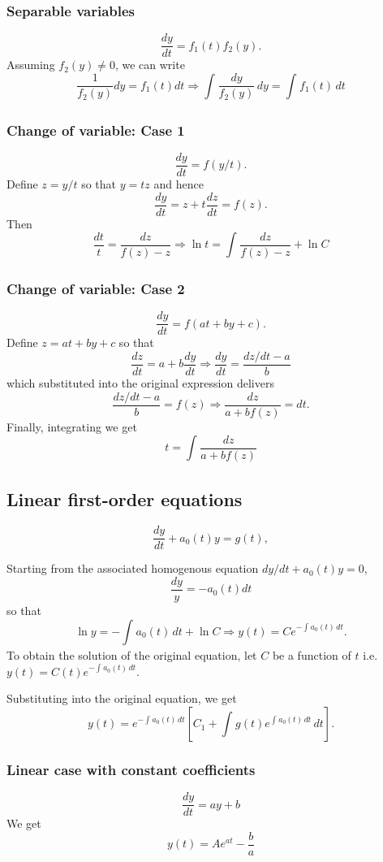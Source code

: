\subsubsection{Separable variables}
\[
    \frac{dy}{dt} = f_1(t)f_2(y).
\]
Assuming $f_2(y) \neq 0$, we can write \[
    \frac{1}{f_2(y)}dy = f_1(t)dt \Longrightarrow \int_{}^{} \frac{dy}{f_2(y)} \, dy = \int_{}^{} f_1(t) \, dt
\]

\subsubsection{Change of variable: Case 1}
\[
    \frac{dy}{dt} = f(y/t).
\]
Define $z = y/t$ so that $y=tz$ and hence \[
    \frac{dy}{dt} = z + t \frac{dz}{dt} = f(z).
\]
Then \[
    \frac{dt}{t} = \frac{dz}{f(z) - z} \Longrightarrow \ln t = \int_{}^{} \frac{dz}{f(z) - z} + \ln C
\]

\subsubsection{Change of variable: Case 2}
\[
    \frac{dy}{dt} = f(at+by+c).
\]
Define $z=at+by+c$ so that \[
    \frac{dz}{dt} = a+b \frac{dy}{dt} \Longrightarrow \frac{dy}{dt} = \frac{dz/dt -a}{b}
\] which substituted into the original expression delivers \[
    \frac{dz/dt-a}{b} = f(z) \Longrightarrow \frac{dz}{a+bf(z)} = dt.
\]
Finally, integrating we get \[
    t = \int_{}^{} \frac{dz}{a+bf(z)}
\]

\subsection{Linear first-order equations}
\[
    \frac{dy}{dt} + a_0(t)y = g(t),
\]

Starting from the associated homogenous equation $dy/dt + a_0(t)y = 0$, \[
    \frac{dy}{y} = -a_0(t)dt
\] so that \[
    \ln y = -\int_{}^{} a_0(t) \, dt + \ln C \Longrightarrow y(t) = Ce ^{-\int_{}^{} a_0(t) \, dt}.
\]
To obtain the solution of the original equation, let $C$ be a function of $t$ i.e. $y(t) = C(t)e ^{-\int_{}^{} a_0(t) \, dt}$.

Substituting into the original equation, we get \[
    y(t) = e ^{-\int_{}^{} a_0(t) \, dt}[C_1 + \int_{}^{} g(t)e ^{\int_{}^{} a_0(t) \, dt} \, dt].
\]

\subsubsection{Linear case with constant coefficients}
\[
    \frac{dy}{dt} = ay+b
\]
We get \[
    y(t) = Ae ^{at} - \frac{b}{a}
\]

